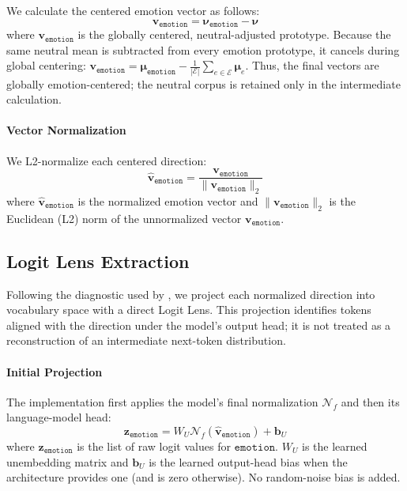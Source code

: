 We calculate the centered emotion vector as follows:
\begin{equation}
    \mathbf{v}_{\mathtt{emotion}}=\boldsymbol{\nu}_{\mathtt{emotion}}-\boldsymbol{\nu}
    \label{eqtn:emotion-vector}
\end{equation}
where $\mathbf{v}_{\mathtt{emotion}}$ is the globally centered, neutral-adjusted prototype. Because the same neutral mean is subtracted from 
every emotion prototype, it cancels during global centering: $\mathbf{v}_{\mathtt{emotion}}=\boldsymbol{\mu}_{\mathtt{emotion}}-\frac{1}{|\mathcal{E}|}\sum_{e\in\mathcal{E}}\boldsymbol{\mu}_e$. 
Thus, the final vectors are globally emotion-centered; the neutral corpus is retained only in the intermediate calculation.

\paragraph{Vector Normalization} We L2-normalize each centered direction:
\begin{equation}
    \mathbf{\hat{v}}_{\mathtt{emotion}}=\frac{\mathbf{v}_{\mathtt{emotion}}}{\lVert \mathbf{v}_{\mathtt{emotion}} \rVert_2}
    \label{eqtn:normalized-emotion}
\end{equation}
where $\mathbf{\hat{v}}_{\mathtt{emotion}}$ is the normalized emotion vector and $\lVert \mathbf{v}_{\mathtt{emotion}} \rVert_2$ is the Euclidean
(L2) norm of the unnormalized vector $\mathbf{v}_{\mathtt{emotion}}$.

\subsection{Logit Lens Extraction}

Following the diagnostic used by \cite{hsieh_replicating_2026}, we project each normalized direction into vocabulary space with a direct 
Logit Lens. This projection identifies tokens aligned with the direction under the model's output head; it is not treated as a reconstruction 
of an intermediate next-token distribution.

\paragraph{Initial Projection} The implementation first applies the model's final normalization $\mathcal{N}_f$ and then its language-model head:
\begin{equation}
    \mathbf{z}_{\mathtt{emotion}}=W_U\mathcal{N}_f\!\left(\mathbf{\hat{v}}_{\mathtt{emotion}}\right)+\mathbf{b}_U
    \label{eqtn:initial-projection}
\end{equation}
where $\mathbf{z}_{\mathtt{emotion}}$ is the list of raw logit values for $\mathtt{emotion}$. $W_U$ 
is the learned unembedding matrix and $\mathbf{b}_U$ is the learned output-head bias when the architecture provides one (and is zero otherwise). 
No random-noise bias is added.

